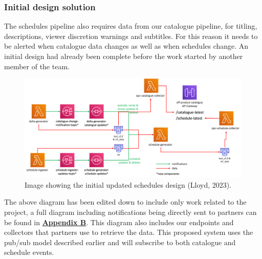     \subsubsection{Initial design solution}
    The schedules pipeline also requires data from our catalogue pipeline, for titling, descriptions, viewer discretion warnings and subtitles. For this 
    reason it needs to be alerted when catalogue data changes as well as when schedules change. An initial design had already been complete before the work 
    started by another member of the team.

    \begin{figure}[H]
      \centering
      \includegraphics[width=12cm]{assets/initialDesign/architecture.png}
      \caption{Image showing the initial updated schedules design (Lloyd, 2023).}
      \label{fig:initialDesign}
    \end{figure}

    The above diagram has been edited down to include only work related to the project, a full diagram including notifications being directly sent to partners can 
    be found in \hyperref[sec:AppendixB]{\textbf{Appendix B}}. This diagram also includes our endpoints and collectors that partners use to 
    retrieve the data. This proposed system uses the pub/sub model described earlier and will subscribe to both catalogue and schedule events.

